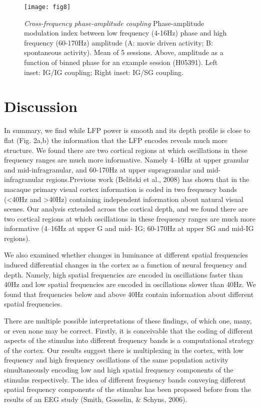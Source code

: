 \begin{figure}[htbp]
\centering \texttt{[image: fig8]}
%
\caption{%
\textit{Cross-frequency phase-amplitude coupling}
Phase-amplitude modulation index between low frequency (4-16Hz) phase and high 
frequency (60-170Hz) amplitude (A: movie driven activity; B: spontaneous 
activity). Mean of 5 sessions.
Above, amplitude as a function of binned phase for an example session (H05391). 
Left inset: IG/IG coupling; Right inset: IG/SG coupling.}%
\label{fig:lam_8}
%
\end{figure}

\section{Discussion}
In summary, we find while LFP power is smooth and its depth profile is close to flat (Fig. 2a,b) the information that the LFP encodes reveals much more structure. We found there are two cortical regions at which oscillations in these frequency ranges are much more informative. Namely 4--16Hz at upper granular and mid-infragranular, and 60-170Hz at upper supragranular and mid{}-infragranular regions.Previous work (Belitski et al., 2008) has shown that in the macaque primary visual cortex information is coded in two frequency bands ({\textless}40Hz and {\textgreater}40Hz) containing independent information about natural visual scenes. Our analysis extended across the cortical depth, and we found there are two cortical regions at which oscillations in these frequency ranges are much more informative (4--16Hz at upper G and mid- IG; 60-170Hz at upper SG and mid-IG regions).

We also examined whether changes in luminance at different spatial frequencies induced differential changes in the cortex as a function of neural frequency and depth. Namely, high spatial frequencies are encoded in oscillations faster than 40Hz and low spatial frequencies are encoded in oscillations slower than 40Hz. We found that frequencies below and above 40Hz contain information about different spatial frequencies.

There are multiple possible interpretations of these findings, of which one, many, or even none may be correct. Firstly, it is conceivable that the coding of different aspects of the stimulus into different frequency bands is a computational strategy of the cortex. Our results suggest there is multiplexing in the cortex, with low frequency and high frequency oscillations of the same population activity simultaneously encoding low and high spatial frequency components of the stimulus respectively. The idea of different frequency bands conveying different spatial frequency components of the stimulus has been proposed before from the results of an EEG study (Smith, Gosselin, \& Schyns, 2006).

